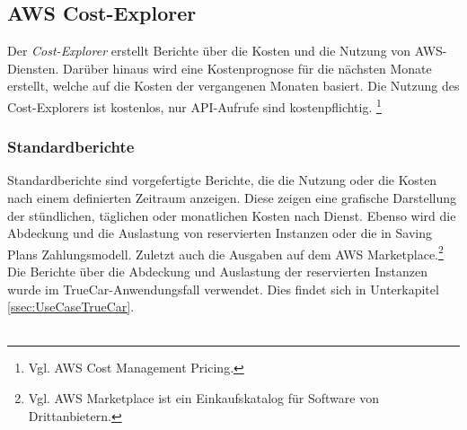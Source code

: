 \subsection{AWS Cost-Explorer}\label{ssec:Cost-Explorer}
Der \textit{Cost-Explorer} erstellt Berichte über die Kosten und die Nutzung von AWS-Diensten. Darüber hinaus wird eine Kostenprognose für die nächsten Monate erstellt, welche auf die Kosten der vergangenen Monaten basiert. Die Nutzung des Cost-Explorers ist kostenlos, nur API-Aufrufe sind kostenpflichtig. \footnote{Vgl. {AWS Cost Management Pricing\cite{AMZ22}.}}
\subsubsection*{Standardberichte}
Standardberichte sind vorgefertigte Berichte, die die Nutzung oder die Kosten nach einem definierten Zeitraum anzeigen. Diese zeigen eine grafische Darstellung der stündlichen, täglichen oder monatlichen Kosten nach Dienst. Ebenso wird die Abdeckung und die Auslastung von reservierten Instanzen oder die in Saving Plans Zahlungsmodell. Zuletzt auch die Ausgaben auf dem AWS Marketplace.\footnote{Vgl. {AWS Marketplace ist ein Einkaufskatalog für Software von Drittanbietern\cite{AMZ34}.}} Die Berichte über die Abdeckung und Auslastung der reservierten Instanzen wurde im TrueCar-Anwendungsfall verwendet. Dies findet sich in Unterkapitel \ref{ssec:UseCaseTrueCar}.
\\\\
